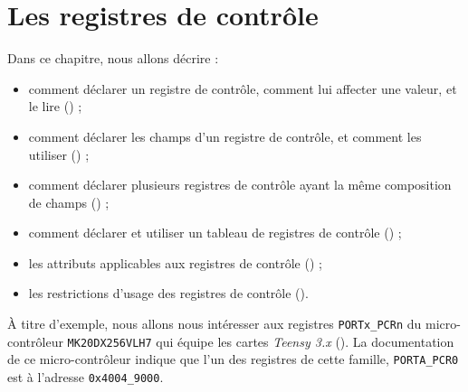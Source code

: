 

\chapter{Les registres de contrôle}



Dans ce chapitre, nous allons décrire :
\begin{itemize}
  \item comment déclarer un registre de contrôle, comment lui affecter une valeur, et le lire () ;
  \item comment déclarer les champs d'un registre de contrôle, et comment les utiliser () ;
  \item comment déclarer plusieurs registres de contrôle ayant la même composition de champs () ;
  \item comment déclarer et utiliser un tableau de registres de contrôle () ;
  \item les attributs applicables aux registres de contrôle () ;
  \item les restrictions d'usage des registres de contrôle ().
\end{itemize}

À titre d'exemple, nous allons nous intéresser aux registres \texttt{PORTx\_PCRn} du micro-contrôleur \texttt{MK20DX256VLH7} qui équipe les cartes \emph{Teensy 3.x} (). La documentation de ce micro-contrôleur indique que l'un des registres de cette famille, \texttt{PORTA\_PCR0} est à l'adresse \texttt{0x4004\_9000}.


